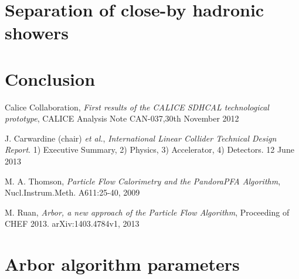 \documentclass[cits]{JINST}
\begin{document}
\section{Separation of close-by hadronic showers}


\section{Conclusion} 


\begin{thebibliography}{6}
\renewcommand{\hepex}[1]{\href{http://www.arxiv.org/abs/#1}{\tt hep-ex/#1}}
\renewcommand{\physics}[1]{\href{http://www.arxiv.org/abs/#1}{\tt phys.int-det/#1}}
\newcommand\nim[4]{\href{http://dx.doi.org/10.1016/#4}
  {\emph{Nucl.\ Instrum.\ Meth.} {\bf #1} (#2) #3}}



Calice Collaboration, \emph{First results of the CALICE SDHCAL technological prototype}, CALICE Analysis Note CAN-037,30th November 2012

J. Carwardine (chair) {\it et al.},  \emph{International Linear Collider Technical Design Report}. 1) Executive Summary, 2) Physics, 3) Accelerator, 4) Detectors. 12 June 2013

M. A. Thomson, \emph{Particle Flow Calorimetry and the PandoraPFA Algorithm}, Nucl.Instrum.Meth. A611:25-40, 2009


M. Ruan, \emph{Arbor, a new approach of the Particle Flow Algorithm}, Proceeding of CHEF 2013. arXiv:1403.4784v1, 2013

\newpage

\end{thebibliography}


\clearpage
\appendix

\section{Arbor algorithm parameters}
\label{ARBOR_ALGORITHM_PARAMETERS}
\end{document}
